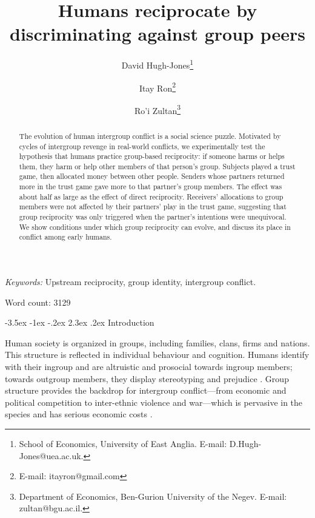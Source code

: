 \documentclass[12pt,a4paper]{article}\usepackage[]{graphicx}\usepackage[]{color}
\title{\bf\sffamily Humans reciprocate %
by discriminating against group peers}
\author{David Hugh-Jones\thanks{School of Economics, University of East Anglia. E-mail: D.Hugh-Jones@uea.ac.uk.} \and Itay Ron\thanks{E-mail: itayron@gmail.com} \and Ro'i Zultan\thanks{Department of Economics, Ben-Gurion University of the Negev. E-mail: zultan@bgu.ac.il.}}
\date{}%
\makeatletter
\renewcommand\section{\@startsection {section}{1}{\z@}%
{-3.5ex \@plus -1ex \@minus -.2ex}%
{2.3ex \@plus.2ex}%
{\bf\sffamily\Large}}
\makeatother
\begin{document}
\maketitle

\begin{abstract}
The evolution of human intergroup conflict is a social science puzzle. 
Motivated by cycles of intergroup revenge in real-world conflicts, we experimentally
test the hypothesis that humans practice group-based reciprocity: if someone
harms or helps them, they harm or help other members of that person's group.
Subjects played a trust game, then allocated money between other people. Senders
whose partners returned more in the trust game gave more to that partner's group
members. The effect was about half as large as the effect of direct reciprocity.
Receivers' allocations to group members were not affected by their partners’ 
play in the trust game, suggesting that group reciprocity was only triggered when the
partner's intentions were unequivocal. We show conditions under which group 
reciprocity can evolve, and discuss its place in conflict among early humans.
\end{abstract}

\emph{Keywords:} Upstream reciprocity, group identity, intergroup conflict.

Word count: 3129

\newpage

\section{Introduction}

Human society is organized in groups, including families, clans, firms and nations. This
structure is reflected in individual behaviour and cognition. Humans identify
with their ingroup and are altruistic and prosocial towards ingroup members;
towards outgroup members, they display stereotyping and prejudice
\citep{tajfel1979integrative,yamagishi2000thegroup,balliet2014ingroup,DeDreu2014,chen2009group,chen2011potential}.
Group structure provides the backdrop for intergroup conflict---from economic
and political competition to inter-ethnic violence and war---which is pervasive
in the species \citep{esteban2012ethnicity} and has serious economic costs \citep{world_bank_world_2011}.
\end{document}
